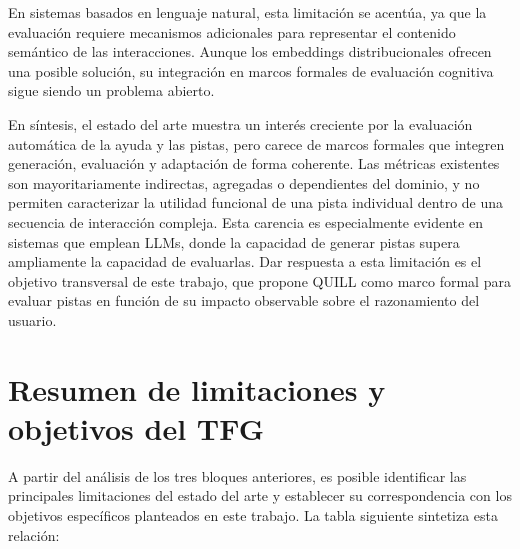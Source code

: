 \documentclass[../main.tex]{subfiles}
\begin{document}
En sistemas basados en lenguaje natural, esta limitación se acentúa, ya que la evaluación requiere mecanismos adicionales para representar el contenido semántico de las interacciones. Aunque los embeddings distribucionales ofrecen una posible solución, su integración en marcos formales de evaluación cognitiva sigue siendo un problema abierto.

En síntesis, el estado del arte muestra un interés creciente por la evaluación automática de la ayuda y las pistas, pero carece de marcos formales que integren generación, evaluación y adaptación de forma coherente. Las métricas existentes son mayoritariamente indirectas, agregadas o dependientes del dominio, y no permiten caracterizar la utilidad funcional de una pista individual dentro de una secuencia de interacción compleja. Esta carencia es especialmente evidente en sistemas que emplean LLMs, donde la capacidad de generar pistas supera ampliamente la capacidad de evaluarlas. Dar respuesta a esta limitación es el objetivo transversal de este trabajo, que propone QUILL como marco formal para evaluar pistas en función de su impacto observable sobre el razonamiento del usuario.


\section{Resumen de limitaciones y objetivos del TFG}

A partir del análisis de los tres bloques anteriores, es posible identificar las principales limitaciones del estado del arte y establecer su correspondencia con los objetivos específicos planteados en este trabajo. La tabla siguiente sintetiza esta relación:
\end{document}
